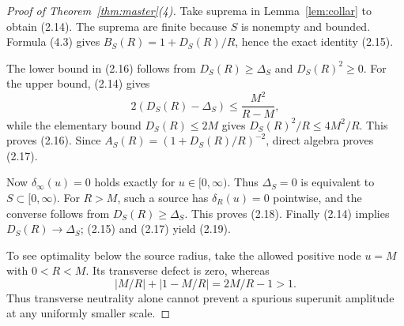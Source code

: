 \documentclass[11pt]{article}
\theoremstyle{remark}
\begin{document}
\begin{proof}[Proof of Theorem~\ref{thm:master}(4)]
Take suprema in Lemma~\ref{lem:collar} to obtain (2.14).  The suprema are finite because $S$ is
nonempty and bounded.  Formula (4.3) gives
$B_S(R)=1+D_S(R)/R$, hence the exact identity (2.15).

The lower bound in (2.16) follows from $D_S(R)\ge\Delta_S$ and $D_S(R)^2\ge0$.  For the upper
bound, (2.14) gives
\[
 2(D_S(R)-\Delta_S)\le\frac{M^2}{R-M},
\]
while the elementary bound $D_S(R)\le2M$ gives
$D_S(R)^2/R\le4M^2/R$.  This proves (2.16).  Since
$A_S(R)=(1+D_S(R)/R)^{-2}$, direct algebra proves (2.17).

Now $\delta_\infty(u)=0$ holds exactly for $u\in[0,\infty)$.  Thus
$\Delta_S=0$ is equivalent to $S\subset[0,\infty)$.  For $R>M$, such a source has
$\delta_R(u)=0$ pointwise, and the converse follows from $D_S(R)\ge\Delta_S$.  This proves
(2.18).  Finally (2.14) implies $D_S(R)\to\Delta_S$; (2.15) and (2.17) yield (2.19).

To see optimality below the source radius, take the allowed positive node $u=M$ with $0<R<M$.
Its transverse defect is zero, whereas
\[
 |M/R|+|1-M/R|=2M/R-1>1.
\]
Thus transverse neutrality alone cannot prevent a spurious superunit amplitude at any uniformly
smaller scale.
\end{proof}
\end{document}
